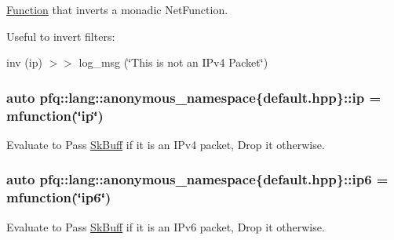 \hyperlink{structpfq_1_1lang_1_1Function}{Function} that inverts a monadic Net\+Function. 

Useful to invert filters\+:

inv (ip) $>$$>$ log\+\_\+msg (\char`\"{}\+This is not an I\+Pv4 Packet\char`\"{}) \hypertarget{namespacepfq_1_1lang_1_1anonymous__namespace_02default_8hpp_03_a738d1b52bf88feb4f7b1a17b97cdc8df}{
\subsubsection[{ip}]{\setlength{\rightskip}{0pt plus 5cm}auto pfq\+::lang\+::anonymous\+\_\+namespace\{default.\+hpp\}\+::ip = {\bf mfunction}(\char`\"{}ip\char`\"{})}}\label{namespacepfq_1_1lang_1_1anonymous__namespace_02default_8hpp_03_a738d1b52bf88feb4f7b1a17b97cdc8df}


Evaluate to {\ttfamily Pass} \hyperlink{structpfq_1_1lang_1_1SkBuff}{Sk\+Buff} if it is an I\+Pv4 packet, {\ttfamily Drop} it otherwise. 

\hypertarget{namespacepfq_1_1lang_1_1anonymous__namespace_02default_8hpp_03_a5df1535f3c8090b714928b77f5a9cf18}{
\subsubsection[{ip6}]{\setlength{\rightskip}{0pt plus 5cm}auto pfq\+::lang\+::anonymous\+\_\+namespace\{default.\+hpp\}\+::ip6 = {\bf mfunction}(\char`\"{}ip6\char`\"{})}}\label{namespacepfq_1_1lang_1_1anonymous__namespace_02default_8hpp_03_a5df1535f3c8090b714928b77f5a9cf18}


Evaluate to {\ttfamily Pass} \hyperlink{structpfq_1_1lang_1_1SkBuff}{Sk\+Buff} if it is an I\+Pv6 packet, {\ttfamily Drop} it otherwise. 

